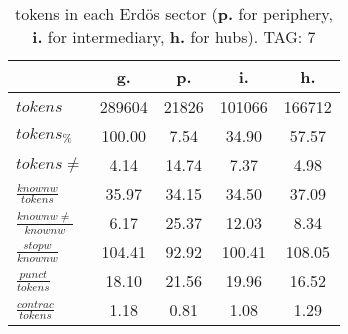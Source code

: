 \begin{table}[h!]
\begin{center}
\begin{tabular}{| l | c | c | c | c |}\hline
 & g. & p. & i. & h. \\\hline
$tokens$ & 289604  & 21826  & 101066  & 166712 \\\hline
$tokens_{\%}$ & 100.00  & 7.54  & 34.90  & 57.57 \\\hline
$tokens \neq$ & 4.14  & 14.74  & 7.37  & 4.98 \\\hline
$\frac{knownw}{tokens}$ & 35.97  & 34.15  & 34.50  & 37.09 \\\hline
$\frac{knownw \neq}{knownw}$ & 6.17  & 25.37  & 12.03  & 8.34 \\\hline
$\frac{stopw}{knownw}$ & 104.41  & 92.92  & 100.41  & 108.05 \\\hline
$\frac{punct}{tokens}$ & 18.10  & 21.56  & 19.96  & 16.52 \\\hline
$\frac{contrac}{tokens}$ & 1.18  & 0.81  & 1.08  & 1.29 \\\hline
\end{tabular}
\caption{tokens in each Erd\"os sector ({{\bf p.}} for periphery, {{\bf i.}} for intermediary, 
    {{\bf h.}} for hubs). TAG: 7}
\end{center}
\end{table}